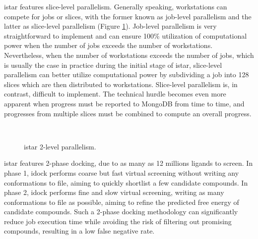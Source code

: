 istar features slice-level parallelism. Generally speaking, workstations can compete for jobs or slices, with the former known as job-level parallelism and the latter as slice-level parallelism (Figure \ref{istar:2LevelParallelism}). Job-level parallelism is very straightforward to implement and can ensure 100\% utilization of computational power when the number of jobs exceeds the number of workstations. Nevertheless, when the number of workstations exceeds the number of jobs, which is usually the case in practice during the initial stage of istar, slice-level parallelism can better utilize computational power by subdividing a job into 128 slices which are then distributed to workstations. Slice-level parallelism is, in contrast, difficult to implement. The technical hurdle becomes even more apparent when progress must be reported to MongoDB from time to time, and progresses from multiple slices must be combined to compute an overall progress.

\begin{figure}
\centering
{}
\\
\caption{istar 2-level parallelism.}
\label{istar:2LevelParallelism}
\end{figure}

istar features 2-phase docking, due to as many as 12 millions ligands to screen. In phase 1, idock performs coarse but fast virtual screening without writing any conformations to file, aiming to quickly shortlist a few candidate compounds. In phase 2, idock performs fine and slow virtual screening, writing as many conformations to file as possible, aiming to refine the predicted free energy of candidate compounds. Such a 2-phase docking methodology can significantly reduce job execution time while avoiding the risk of filtering out promising compounds, resulting in a low false negative rate.

